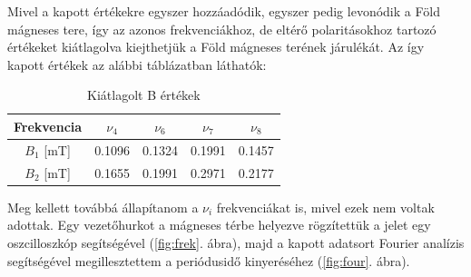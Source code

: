 \documentclass[12pt,a4paper]{article}
\begin{document}
\begin{table}[!h]
\begin{center}
\caption{A számolt B értékek}
\end{center}
\end{table}

Mivel a kapott értékekre egyszer hozzáadódik, egyszer pedig levonódik a Föld mágneses tere, így az azonos frekvenciákhoz, de eltérő polaritásokhoz tartozó értékeket kiátlagolva kiejthetjük a Föld mágneses terének járulékát. Az így kapott értékek az alábbi táblázatban láthatók:
\begin{table}[!h]
\begin{center}
\begin{tabular}{| c || c || c || c || c ||}
\hline
Frekvencia & $\nu_4$ & $\nu_6$ & $\nu_7$ & $\nu_8$\\
\hline
$B_{1}$ [mT] & 0.1096 & 0.1324 & 0.1991 & 0.1457 \\
\hline
$B_{2}$ [mT] & 0.1655 & 0.1991 & 0.2971 & 0.2177 \\
\hline
\end{tabular}
\caption{Kiátlagolt B értékek}
\end{center}
\end{table}


Meg kellett továbbá állapítanom a $\nu_i$ frekvenciákat is, mivel ezek nem voltak adottak. Egy vezetőhurkot a mágneses térbe helyezve rögzítettük a jelet egy oszcilloszkóp segítségével (\ref{fig:frek}. ábra), majd a kapott adatsort Fourier analízis segítségével megillesztettem a periódusidő kinyeréséhez (\ref{fig:four}. ábra).\\

\newpage
\end{document}
